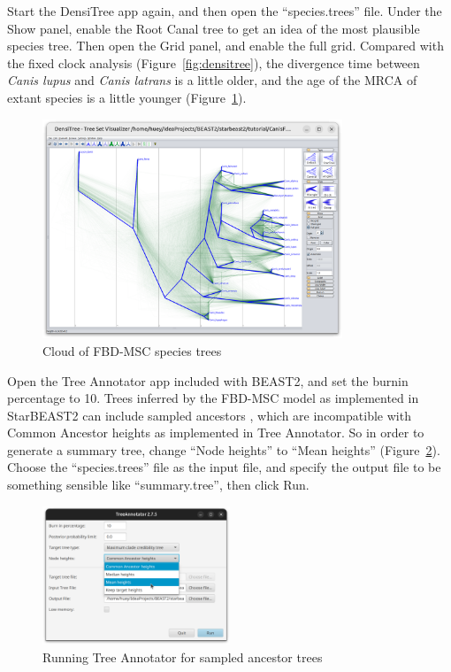 \documentclass[12pt]{article}
\begin{document}
\clearpage

Start the DensiTree app again, and then open the ``species.trees'' file. Under
the Show panel, enable the Root Canal tree to get an idea of the most
plausible species tree. Then open the Grid panel, and enable the full grid.
Compared with the fixed clock analysis (Figure~\ref{fig:densitree}), the
divergence time between \textit{Canis lupus} and \textit{Canis latrans} is a
little older, and the age of the MRCA of extant species is a little younger
(Figure~\ref{fig:sampledAncestorsDensitree}).

\begin{figure}[htb!]
\centering
\includegraphics[width=0.8\textwidth]{figures/sampledAncestorsDensitree.png}
\caption
{Cloud of FBD-MSC species trees}
\label{fig:sampledAncestorsDensitree}
\end{figure}

Open the Tree Annotator app included with BEAST2, and set the burnin
percentage to 10. Trees inferred by the FBD-MSC model as implemented in
StarBEAST2 can include sampled ancestors \parencite{Gavryushkina2014}, which are
incompatible with Common Ancestor heights \parencite{Heled2013} as implemented in
Tree Annotator. So in order to generate a summary tree, change ``Node heights'' to
``Mean heights'' (Figure~\ref{fig:treeAnnotatorMeanHeights}). Choose the
``species.trees'' file as the input file, and specify the output file to be
something sensible like ``summary.tree'', then click Run.

\begin{figure}[htb!]
\centering
\includegraphics[width=0.5\textwidth]{figures/treeAnnotatorMeanHeights.png}
\caption
{Running Tree Annotator for sampled ancestor trees}
\label{fig:treeAnnotatorMeanHeights}
\end{figure}
\end{document}
